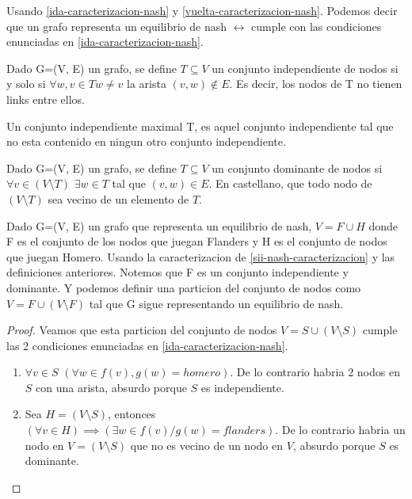 \begin{corollary}
	\label{sii-nash-caracterizacion}
	Usando \ref{ida-caracterizacion-nash} y \ref{vuelta-caracterizacion-nash}. Podemos decir que un grafo representa un equilibrio de nash $\leftrightarrow$ cumple con las condiciones enunciadas en \ref{ida-caracterizacion-nash}.
\end{corollary}

\begin{definition}
	Dado G=(V, E) un grafo, se define $T \subseteq V$ un conjunto independiente de nodos si y solo si $\forall w,v \in T w \neq v$ la arista $(v, w) \notin E$. Es decir, los nodos de T no tienen links entre ellos.
\end{definition}

\begin{definition}
	Un conjunto independiente maximal T, es aquel conjunto independiente tal que no esta contenido en ningun otro conjunto independiente.
\end{definition}

\begin{definition}
	Dado G=(V, E) un grafo, se define $T \subseteq V$ un conjunto dominante de nodos si $\forall v \in (V \setminus T) $ $\exists w \in T $ tal que $ (v, w) \in E$. En castellano, que todo nodo de $(V \setminus T) $ sea vecino de un elemento de $T$.
\end{definition}

\begin{theorem}
	\label{caracterizacion-conjindepdominante}
	Dado G=(V, E) un grafo que representa un equilibrio de nash, $V = F \cup H$ donde F es el conjunto de los nodos que juegan Flanders y H es el conjunto de nodos que juegan Homero. Usando la caracterizacion de \ref{sii-nash-caracterizacion} y las definiciones anteriores. Notemos que F es un conjunto independiente y dominante. Y podemos definir una particion del conjunto de nodos como $V = F \cup (V \setminus F)$ tal que G sigue representando un equilibrio de nash.
\end{theorem}
\begin{proof}
	Veamos que esta particion del conjunto de nodos $V = S \cup (V \setminus S)$ cumple las 2 condiciones enunciadas en \ref{ida-caracterizacion-nash}.
	\begin{enumerate}
		\item $\forall v \in S $ $(\forall w \in f(v), g(w) = homero) $. De lo contrario habria 2 nodos en $S$ con una arista, absurdo porque $S$ es independiente.
		\item Sea $H = (V \setminus S)$, entonces $(\forall v \in H) \implies (\exists w \in f(v)/ g(w) = flanders)$. De lo contrario habria un nodo en $V = (V \setminus S)$ que no es vecino de un nodo en $V$, absurdo porque $S$ es dominante.
	\end{enumerate}
\end{proof}

